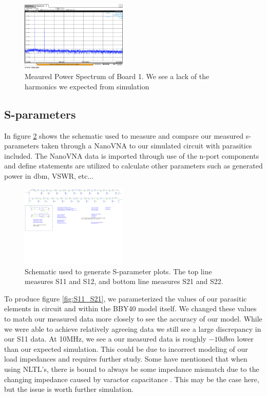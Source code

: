 \documentclass[journal]{IEEEtran} \usepackage[english]{babel}
\begin{document}
\begin{figure}[htb]
\centering
\includegraphics[width=0.45\textwidth]{MeasuredSpectrum.png}
\caption{Meaured Power Spectrum of Board 1. We see a lack of the harmonics we
expected from simulation}
\label{fig:MeasSpec}
\end{figure}





\subsection{S-parameters}


In figure \ref{fig:sparamSchem} shows the schematic used to measure and compare
our measured s-parameters taken through a NanoVNA to our simulated circuit with
parasitics included. The NanoVNA data is imported through use of the n-port
components and define statements are utilized to calculate other parameters such
as generated power in dbm, VSWR, etc...


\begin{figure}[htb]
\centering
\includegraphics[width=0.45\textwidth,page = 1]{images/MostRecentSparamMeasSchem.pdf}
\caption{Schematic used to generate S-parameter plots. The top line measures S11 and S12, and bottom line measures S21 and S22. 
}\label{fig:sparamSchem}
\end{figure}


To produce figure \ref{fig:S11_S21}, we parameterized the values of our
parasitic elements in circuit and within the BBY40 model itself. We changed
these values to match our measured data more closely to see the accuracy of our
model. While we were able to achieve relatively agreeing data we still see a
large discrepancy in our S11 data. At 10MHz, we see a our measured data is
roughly $-10dbm$ lower than our expected simulation. This could be due to
incorrect modeling of our load impedances and requires further study. Some have
mentioned that when using NLTL's, there is bound to always be some impedance
mismatch due to the changing impedance caused by varactor capacitance
\cite{wilson1991pulse}. This may be the case here, but the issue is worth
further simulation.
\end{document}
